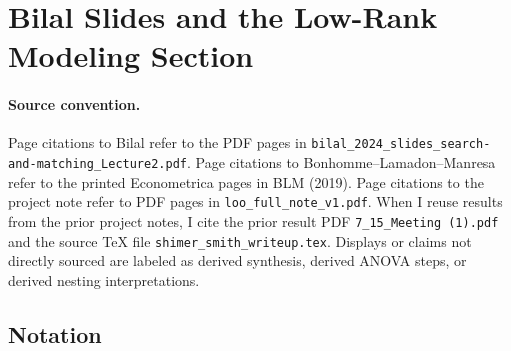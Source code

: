 ﻿\documentclass[11pt]{article}
\newcommand{\1}{\mathbf{1}}
\begin{document}


\section{Bilal Slides and the Low-Rank Modeling Section}

\paragraph{Source convention.}

Page citations to Bilal refer to the PDF pages in
\texttt{bilal\_2024\_slides\_search-and-matching\_Lecture2.pdf}. Page citations
to Bonhomme--Lamadon--Manresa refer to the printed Econometrica pages in BLM
(2019). Page citations to the project note refer to PDF pages in
\texttt{loo\_full\_note\_v1.pdf}. When I reuse results from the prior project
notes, I cite the prior result PDF \texttt{7\_15\_Meeting (1).pdf} and the
source \TeX{} file \texttt{shimer\_smith\_writeup.tex}. Displays or claims not
directly sourced are labeled as derived synthesis, derived ANOVA steps, or
derived nesting interpretations.

\subsection{Notation}
\end{document}
